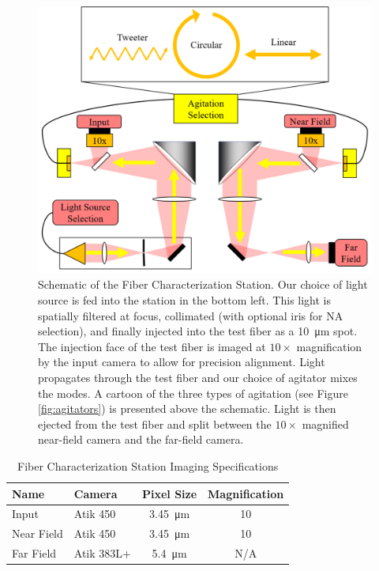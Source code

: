 \begin{figure}
\centering
	\includegraphics[width=\columnwidth]{figures-2/fcs_schematic.pdf}
	\caption{Schematic of the Fiber Characterization Station. Our choice of light source is fed into the station in the bottom left. This light is spatially filtered at focus, collimated (with optional iris for NA selection), and finally injected into the test fiber as a \SI{10}{\micro\meter} spot. The injection face of the test fiber is imaged at $10\times$ magnification by the input camera to allow for precision alignment. Light propagates through the test fiber and our choice of agitator mixes the modes. A cartoon of the three types of agitation (see Figure \ref{fig:agitators}) is presented above the schematic. Light is then ejected from the test fiber and split between the $10\times$ magnified near-field camera and the far-field camera.}
\label{fig:fcs}
\end{figure}

\begin{table}
\centering
\caption{Fiber Characterization Station Imaging Specifications}
	\begin{tabular}{llcc}
	\hline
	Name & Camera & Pixel Size & Magnification \\
	\hline \hline
	Input & Atik 450 & \SI{3.45}{\micro\meter} & 10 \\
	\hline
	Near Field & Atik 450 & \SI{3.45}{\micro\meter} & 10 \\
	\hline
	Far Field & Atik 383L+ & \SI{5.4}{\micro\meter} & N/A \\
	\hline	
	\end{tabular}
\label{table:cameras}
\end{table}

